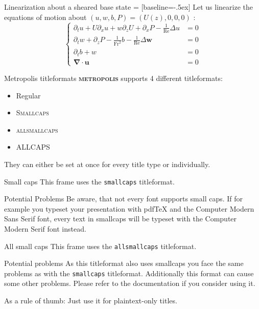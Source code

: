 \documentclass[10pt]{beamer}
\newcommand{\themename}{\textbf{\textsc{metropolis}}\xspace}
\begin{document}
\begin{frame}[fragile]{Linearization about a sheared base state}
   = [baseline=-.5ex]
  Let us linearize the equations of motion about $\left(u,w,b,P\right)=\left(U\left(z\right),0,0,0\right)$ :
  \begin{equation*}
    \begin{cases}
    \partial_{t}u+U\partial_{x}u+w\partial_{z}U +\partial_{x}P-\frac{1}{\mathrm{Re}}\Delta u& = 0\\ 
    \partial_{t}w +\partial_{z}P-\frac{1}{\mathrm{Fr}^{2}}b-\frac{1}{\mathrm{Re}}\Delta\mathbf{w} & = 0 \\ 
    \partial_{t}b+w& =0\\ 
    \boldsymbol{\nabla}\cdot\mathbf{u}& =0
    \end{cases}
  \end{equation*}
\end{frame}

\begin{frame}{Metropolis titleformats}
	\themename supports 4 different titleformats:
	\begin{itemize}
		\item Regular
		\item \textsc{Smallcaps}
		\item \textsc{allsmallcaps}
		\item ALLCAPS
	\end{itemize}
	They can either be set at once for every title type or individually.
\end{frame}

{
\begin{frame}{Small caps}
	This frame uses the \texttt{smallcaps} titleformat.

	\begin{alertblock}{Potential Problems}
		Be aware, that not every font supports small caps. If for example you typeset your presentation with pdfTeX and the Computer Modern Sans Serif font, every text in smallcaps will be typeset with the Computer Modern Serif font instead.
	\end{alertblock}
\end{frame}
}

{
\begin{frame}{All small caps}
	This frame uses the \texttt{allsmallcaps} titleformat.

	\begin{alertblock}{Potential problems}
		As this titleformat also uses smallcaps you face the same problems as with the \texttt{smallcaps} titleformat. Additionally this format can cause some other problems. Please refer to the documentation if you consider using it.

		As a rule of thumb: Just use it for plaintext-only titles.
	\end{alertblock}
\end{frame}
}
\end{document}

